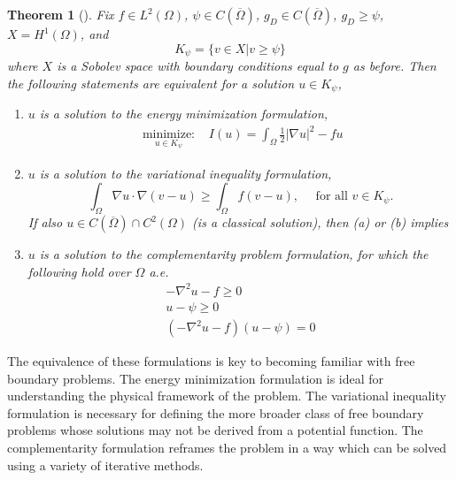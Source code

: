 \documentclass[]{interact}
\theoremstyle{plain}%
\newtheorem{theorem}{Theorem}[section]
\theoremstyle{definition}
\theoremstyle{remark}
\newcommand{\abs}[1]{\left| #1 \right|}
\begin{document}
\begin{theorem}[\cite{KinderlehrerStampacchia1980}] Fix $f \in L^2(\Omega)$, $\psi \in C(\overline{\Omega})$, $g_D \in C(\overline{\Omega})$, $g_D \geq \psi$, $X = H^1(\Omega)$, and
  \begin{equation}
    K_\psi = \{v \in X| v \geq \psi\}
  \end{equation}
   where $X$ is a Sobolev space with boundary conditions equal to $g$ as before. Then the following statements are equivalent for a solution $u \in K_\psi$, 
  \begin{enumerate}
    \item[(a)] $u$ is a solution to the energy minimization formulation, 
\begin{align}
    \underset{u \in K_\psi}{\text{ minimize: }}  &I(u) = \int_\Omega \frac{1}{2} \abs{\nabla u}^2 - fu 
  \end{align}
    \item[(b)] $u$ is a solution to the variational inequality formulation,
      \begin{equation}
    \int_\Omega \nabla u \cdot \nabla(v - u) \geq \int_\Omega f(v - u), \quad \text{ for all } v \in K_\psi.
  \end{equation} 
If also $u \in C(\overline{\Omega}) \cap C^2(\Omega)$ (is a classical solution), then (a) or (b) implies
    \item[(c)] $u$ is a solution to the complementarity problem formulation, for which the following hold over $\Omega$ a.e.
    \begin{subequations}
      \label{ncp}
      \begin{align}
        -\nabla^2 u - f \geq 0\label{ncp:1}\\
        u - \psi \geq 0\label{ncp:1}\\
        (-\nabla^2u - f)(u - \psi) = 0\label{ncp:1}
      \end{align}
    \end{subequations}
  \end{enumerate}
\end{theorem}

The equivalence of these formulations is key to becoming familiar with free boundary problems. The energy minimization formulation is ideal for understanding the physical framework of the problem. The variational inequality formulation is necessary for defining the more broader class of free boundary problems whose solutions may not be derived from a potential function. The complementarity formulation reframes the problem in a way which can be solved using a variety of iterative methods.
\end{document}
